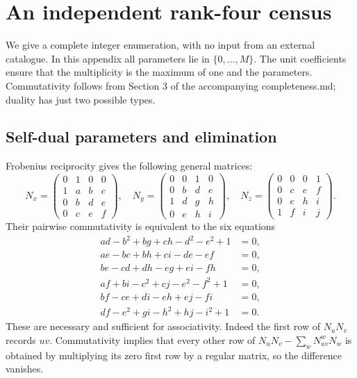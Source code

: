 \section{An independent rank-four census}\label{sec:census}
We give a complete integer enumeration, with no input from an external
catalogue. In this appendix all parameters lie in $\{0,\ldots,M\}$.
The unit coefficients ensure that the multiplicity is the maximum of one
and the parameters. Commutativity follows from Section 3 of the accompanying completeness.md; duality has just two possible types.

\subsection{Self-dual parameters and elimination}
Frobenius reciprocity gives the following general matrices:
\[
N_x=\begin{pmatrix}0&1&0&0\\1&a&b&c\\0&b&d&e\\0&c&e&f\end{pmatrix},\quad
N_y=\begin{pmatrix}0&0&1&0\\0&b&d&e\\1&d&g&h\\0&e&h&i\end{pmatrix},\quad
N_z=\begin{pmatrix}0&0&0&1\\0&c&e&f\\0&e&h&i\\1&f&i&j\end{pmatrix}.
\]
Their pairwise commutativity is equivalent to the six equations
\begin{align}
 ad-b^2+bg+ch-d^2-e^2+1&=0,\label{eq:census1}\\
 ae-bc+bh+ci-de-ef&=0,\label{eq:census2}\\
 be-cd+dh-eg+ei-fh&=0,\label{eq:census3}\\
 af+bi-c^2+cj-e^2-f^2+1&=0,\label{eq:census4}\\
 bf-ce+di-eh+ej-fi&=0,\label{eq:census5}\\
 df-e^2+gi-h^2+hj-i^2+1&=0.\label{eq:census6}
\end{align}
These are necessary and sufficient for associativity. Indeed the first
row of $N_uN_v$ records $uv$. Commutativity implies that every other row
of $N_uN_v-\sum_wN_{uv}^wN_w$ is obtained by multiplying its zero first
row by a regular matrix, so the difference vanishes.

